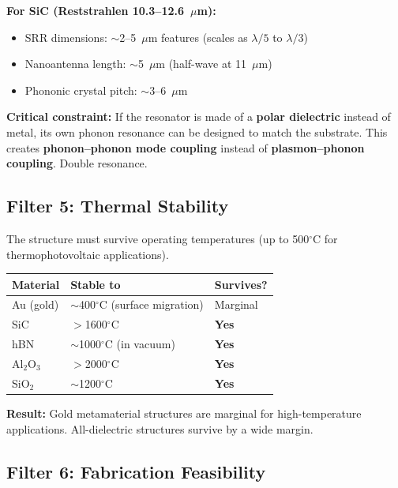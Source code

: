 \documentclass[11pt, a4paper]{article}
\begin{document}
\textbf{For SiC (Reststrahlen 10.3--12.6~$\mu$m):}
\begin{itemize}[nosep]
  \item SRR dimensions: $\sim$2--5~$\mu$m features
        (scales as $\lambda/5$ to $\lambda/3$)
  \item Nanoantenna length: $\sim$5~$\mu$m (half-wave at
        11~$\mu$m)
  \item Phononic crystal pitch: $\sim$3--6~$\mu$m
\end{itemize}

\textbf{Critical constraint:} If the resonator is made of
a \textbf{polar dielectric} instead of metal, its own phonon
resonance can be designed to match the substrate. This creates
\textbf{phonon--phonon mode coupling} instead of
\textbf{plasmon--phonon coupling}. Double resonance.

\subsection{Filter 5: Thermal Stability}

The structure must survive operating temperatures (up to
500$^\circ$C for thermophotovoltaic applications).

\begin{center}
\begin{tabular}{@{}lll@{}}
\toprule
\textbf{Material} & \textbf{Stable to} & \textbf{Survives?} \\
\midrule
Au (gold) & $\sim$400$^\circ$C (surface migration) &
  \textcolor{nm-orange}{Marginal} \\
SiC & $>$1600$^\circ$C & \textcolor{nm-green}{\textbf{Yes}} \\
hBN & $\sim$1000$^\circ$C (in vacuum) &
  \textcolor{nm-green}{\textbf{Yes}} \\
Al$_2$O$_3$ & $>$2000$^\circ$C &
  \textcolor{nm-green}{\textbf{Yes}} \\
SiO$_2$ & $\sim$1200$^\circ$C &
  \textcolor{nm-green}{\textbf{Yes}} \\
\bottomrule
\end{tabular}
\end{center}

\textbf{Result:} Gold metamaterial structures are marginal
for high-temperature applications. All-dielectric structures
survive by a wide margin.

\subsection{Filter 6: Fabrication Feasibility}
\end{document}

